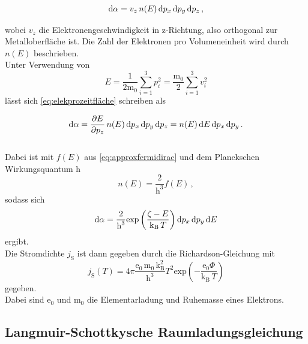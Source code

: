 \begin{equation}
    \mathrm{d} \alpha = v_z \, n(E) \, \mathrm{d} p_x \, \mathrm{d} p_y \, \mathrm{d} p_z \,,
    \label{eq:elekprozeitfläche}
\end{equation}

wobei $v_z$ die Elektronengeschwindigkeit in z-Richtung,
also orthogonal zur Metalloberfläche ist.
Die Zahl der Elektronen pro Volumeneinheit wird durch $n(E)$ beschrieben. \\

Unter Verwendung von
\begin{equation*}
    E = \dfrac{1}{2 \text{m}_0} \sum_{i=1}^3 p^2_i = \dfrac{\text{m}_0}{2} \sum_{i=1}^3 v^2_i
\end{equation*}
lässt sich \eqref{eq:elekprozeitfläche} schreiben als

\begin{equation}
    \mathrm{d} \alpha = \dfrac{\partial E}{\partial p_z} \, n(E) \, \mathrm{d} p_x \, \mathrm{d} p_y 
    \, \mathrm{d} p_{z} = n(E) \, \mathrm{d} E \, \mathrm{d} p_x \, \mathrm{d} p_y \,.
    \label{eq:dalphaE}
\end{equation} \\

Dabei ist mit $f(E)$ aus \eqref{eq:approxfermidirac} und dem Planckschen Wirkungsquantum h
\begin{equation*}
    n(E) = \dfrac{2}{\text{h}^3} f(E) \,,
\end{equation*}
sodass sich
\begin{equation*}
    \mathrm{d} \alpha = \dfrac{2}{\text{h}^3} \text{exp} \left(\dfrac{\zeta - E}{\text{k}_\text{B} \, T} \right)
                    \mathrm{d} p_x \, \mathrm{d} p_y \, \mathrm{d} E
\end{equation*}
ergibt. \\

Die Stromdichte $j_\text{S}$ ist dann gegeben durch die Richardson-Gleichung mit
\begin{equation}
    j_\text{S} (T) = 4 \pi \dfrac{\text{e}_0 \, \text{m}_0 \, \text{k}^2_\text{B}}{\text{h}^3}
                     T^2 \text{exp} \left(- \dfrac{\text{e}_0 \Phi}{\text{k}_\text{B} \, T}\right)
    \label{eq:stromdichte}
\end{equation}
gegeben. \\
Dabei sind $\text{e}_0$ und $\text{m}_0$ die Elementarladung und Ruhemasse eines Elektrons.



\subsection{Langmuir-Schottkysche Raumladungsgleichung}

